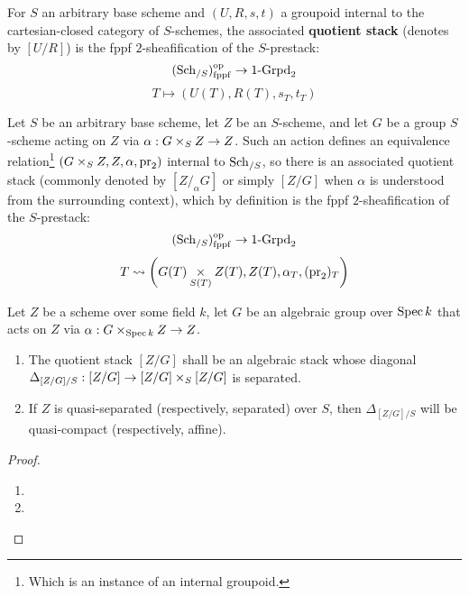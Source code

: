             \begin{definition} \label{def: quotient_stacks}
                For $S$ an arbitrary base scheme and $(U, R, s, t)$ a groupoid internal to the cartesian-closed category of $S$-schemes, the associated \textbf{quotient stack} (denotes by $[U/R]$) is the fppf $2$-sheafification of the $S$-prestack:
                    $$(\mathrm{Sch}_{/S})_{\mathrm{fppf}}^{\mathrm{op}} \to 1\text{-}\mathrm{Grpd}_2$$
                    $$T \mapsto (U(T), R(T), s_T, t_T)$$
            \end{definition}
            \begin{example} \label{example: quotient_stacks_associated_to_group_scheme_actions}
                Let $S$ be an arbitrary base scheme, let $Z$ be an $S$-scheme, and let $G$ be a group $S$-scheme acting on $Z$ via $\alpha: G \x_S Z \to Z$. Such an action defines an equivalence relation\footnote{Which is an instance of an internal groupoid.} $(G \x_S Z, Z, \alpha, \pr_2)$ internal to $\mathrm{Sch}_{/S}$, so there is an associated quotient stack (commonly denoted by $[Z/_{\alpha}G]$ or simply $[Z/G]$ when $\alpha$ is understood from the surrounding context), which by definition is the fppf $2$-sheafification of the $S$-prestack:
                    $$(\mathrm{Sch}_{/S})_{\mathrm{fppf}}^{\mathrm{op}} \to 1\text{-}\mathrm{Grpd}_2$$
                    $$T \mapsto \left(G(T) \x_{S(T)} Z(T), Z(T), \alpha_T, (\pr_2)_T\right)$$
            \end{example}
            \begin{proposition} \label{prop: quotients_of_schemes_by_algebraic_groups_are_algebraic_stacks}
                Let $Z$ be a scheme over some field $k$, let $G$ be an algebraic group over $\operatorname{Spec} k$ that acts on $Z$ via $\alpha: G \x_{\Spec k} Z \to Z$. 
                    \begin{enumerate}
                        \item The quotient stack $[Z/G]$ shall be an algebraic stack whose diagonal $\Delta_{[Z/G]/S}: [Z/G] \to [Z/G] \x_S [Z/G]$ is separated. 
                        \item If $Z$ is quasi-separated (respectively, separated) over $S$, then $\Delta_{[Z/G]/S}$ will be quasi-compact (respectively, affine).
                    \end{enumerate}
            \end{proposition}
                \begin{proof}
                    \noindent
                    \begin{enumerate}
                        \item 
                        \item 
                    \end{enumerate}
                \end{proof}
        
